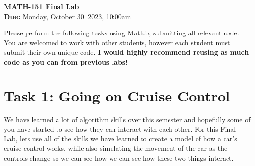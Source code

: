 \documentclass[11pt]{article}
\begin{document}
	
	\begin{center}
		\Large{\textbf{MATH-151 Final Lab}}\\
			\medskip
		\normalsize{\textbf{Due:} Monday, October 30, 2023, 10:00am} 
	\end{center}
	\noindent\makebox[\linewidth]{\rule{\textwidth}{0.4pt}}
	Please perform the following tasks using Matlab, submitting all relevant code. You are welcomed to work with other students, however each student must submit their own unique code. \textbf{I would highly recommend reusing as much code as you can from previous labs!}
	\section*{Task 1: Going on Cruise Control}
	\noindent We have learned a lot of algorithm skills over this semester and hopefully some of you have started to see how they can interact with each other. For this Final Lab, lets use all of the skills we have learned to create a model of how a car's cruise control works, while also simulating the movement of the car as the controls change so we can see how we can see how these two things interact.
\end{document}
